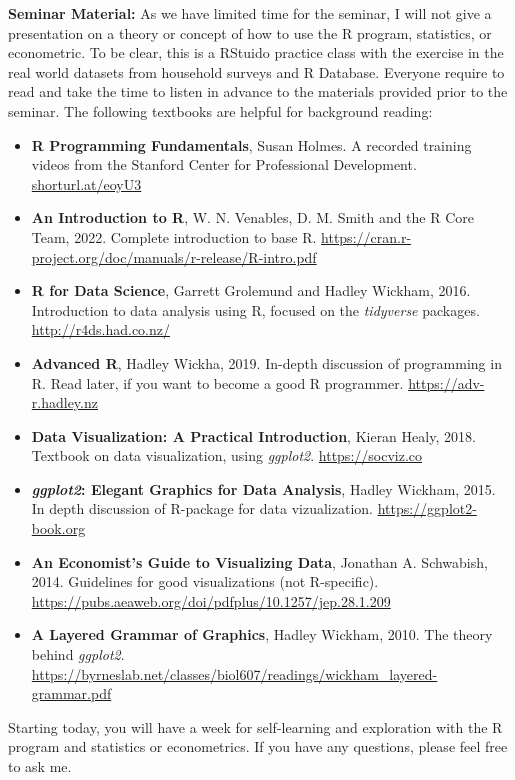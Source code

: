 \documentclass[11pt,a4paper]{letter}
\begin{document}
\noindent \textbf{Seminar Material:} As we have limited time for the seminar, I will not give a presentation on a theory or concept of how to use the R program, statistics, or econometric. To be clear, this is a RStuido practice class with the exercise in the real world datasets from household surveys and R Database. Everyone require to read and take the time to listen in advance to the materials provided prior to the seminar. The following textbooks are helpful for background reading: 
\begin{itemize}
	\item \textbf{R Programming Fundamentals}, Susan Holmes.  A recorded training videos from the Stanford Center for Professional Development. \url{shorturl.at/eoyU3} 
	\item \textbf{An Introduction to R}, W. N. Venables, D. M. Smith and the R Core Team, 2022. Complete introduction to base R. \url{https://cran.r-project.org/doc/manuals/r-release/R-intro.pdf} 
	\item \textbf{R for Data Science}, Garrett Grolemund and Hadley Wickham, 2016. Introduction to data analysis using R, focused on the \textit{tidyverse} packages. \url{http://r4ds.had.co.nz/} 
	\item \textbf{Advanced R}, Hadley Wickha, 2019. In-depth discussion of programming in R. Read later, if you want to become a good R programmer. \url{https://adv-r.hadley.nz}
	\item \textbf{Data Visualization: A Practical Introduction}, Kieran Healy, 2018. Textbook on data visualization, using \textit{ggplot2}. \url{https://socviz.co}
	\item \textbf{\textit{ggplot2}: Elegant Graphics for Data Analysis}, Hadley Wickham, 2015. In depth discussion of R-package for data vizualization. \url{https://ggplot2-book.org}
	\item \textbf{An Economist’s Guide to Visualizing Data}, Jonathan A. Schwabish, 2014. Guidelines for good visualizations (not R-specific). \url{https://pubs.aeaweb.org/doi/pdfplus/10.1257/jep.28.1.209}
	\item \textbf{A Layered Grammar of Graphics}, Hadley Wickham, 2010. The theory behind \textit{ggplot2}. \url{https://byrneslab.net/classes/biol607/readings/wickham_layered-grammar.pdf}
	
\end{itemize}
Starting today, you will have a week for self-learning and exploration with the R program and statistics or econometrics. If you have any questions, please feel free to ask me.      
  
\end{document}
